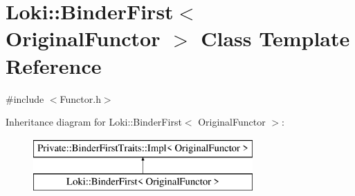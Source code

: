 \hypertarget{classLoki_1_1BinderFirst}{}\section{Loki\+:\+:Binder\+First$<$ Original\+Functor $>$ Class Template Reference}
\label{classLoki_1_1BinderFirst}


{\ttfamily \#include $<$Functor.\+h$>$}

Inheritance diagram for Loki\+:\+:Binder\+First$<$ Original\+Functor $>$\+:\begin{figure}[H]
\begin{center}
\leavevmode
\includegraphics[height=2.000000cm]{classLoki_1_1BinderFirst}
\end{center}
\end{figure}
